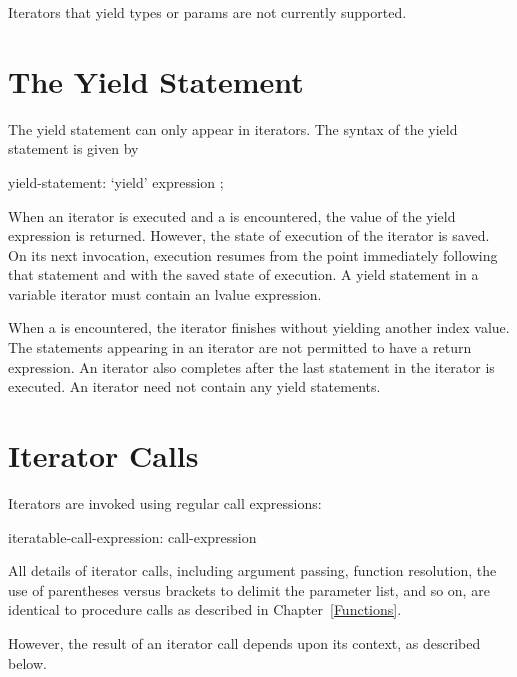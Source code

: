 \begin{openissue}
Iterators that yield types or params are not currently supported.
\end{openissue}

\section{The Yield Statement}
\label{The_Yield_Statement}

The yield statement can only appear in iterators.  The syntax of the
yield statement is given by
\begin{syntax}
yield-statement:
  `yield' expression ;
\end{syntax}

When an iterator is executed and a  is encountered, the value of the yield
expression is returned.  However, the state of execution of the iterator is
saved.  On its next invocation, execution resumes from the point immediately
following that  statement and with the saved state of execution.
A yield statement in a variable iterator must contain an lvalue expression.

When a  is encountered, the iterator finishes without yielding another
index value.  The  statements appearing in an iterator are not
permitted to have a return expression.
An iterator also completes after the last
statement in the iterator is executed.
An iterator need not contain any yield statements.


\section{Iterator Calls}
\label{Iterator_Calls}

Iterators are invoked using regular call expressions:
\begin{syntax}
iteratable-call-expression:
  call-expression
\end{syntax}

All details of iterator calls, including argument passing, function
resolution, the use of parentheses versus brackets to delimit the parameter
list, and so on,
are identical to procedure calls as described in Chapter~\ref{Functions}.

However, the result of an iterator call depends upon its context, as described below.

